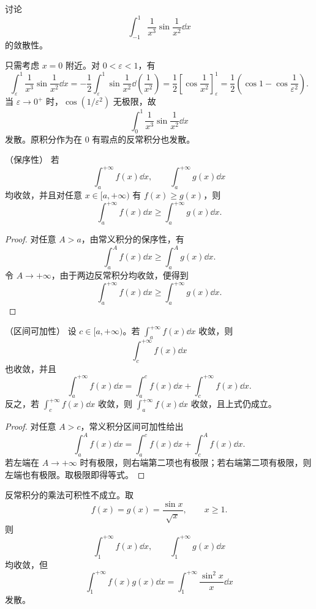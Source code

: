 \begin{example}
	讨论
	\[
	\int_{-1}^{1}\frac1{x^3}\sin\frac1{x^2}\dd x
	\]
	的敛散性。
\end{example}

\begin{solution}
	只需考虑 $x=0$ 附近。对 $0<\varepsilon<1$，有
	\[
	\int_{\varepsilon}^{1}\frac1{x^3}\sin\frac1{x^2}\dd x
	=-\frac12\int_{\varepsilon}^{1}\sin\frac1{x^2}\dd\left(\frac1{x^2}\right)
	=\frac12\left[\cos\frac1{x^2}\right]_{\varepsilon}^{1}
	=\frac12\left(\cos 1-\cos\frac1{\varepsilon^2}\right).
	\]
	当 $\varepsilon\to0^+$ 时，$\cos(1/\varepsilon^2)$ 无极限，故
	\[
	\int_0^1\frac1{x^3}\sin\frac1{x^2}\dd x
	\]
	发散。原积分作为在 $0$ 有瑕点的反常积分也发散。
\end{solution}

\begin{proposition}（保序性）
	若
	\[
	\int_a^{+\infty} f(x)\dd x,
	\qquad
	\int_a^{+\infty} g(x)\dd x
	\]
	均收敛，并且对任意 $x\in[a,+\infty)$ 有 $f(x)\geq g(x)$，则
	\[
	\int_a^{+\infty}f(x)\dd x\geq \int_a^{+\infty}g(x)\dd x.
	\]
\end{proposition}

\begin{proof}
	对任意 $A>a$，由常义积分的保序性，有
	\[
	\int_a^{A}f(x)\dd x\geq \int_a^{A}g(x)\dd x.
	\]
	令 $A\to+\infty$，由于两边反常积分均收敛，便得到
	\[
	\int_a^{+\infty}f(x)\dd x\geq \int_a^{+\infty}g(x)\dd x.
	\]
\end{proof}

\begin{proposition}（区间可加性）
	设 $c\in[a,+\infty)$。若 $\displaystyle\int_a^{+\infty}f(x)\dd x$ 收敛，则
	\[
	\int_c^{+\infty}f(x)\dd x
	\]
	也收敛，并且
	\[
	\int_a^{+\infty}f(x)\dd x
	=\int_a^c f(x)\dd x+\int_c^{+\infty}f(x)\dd x.
	\]
	反之，若 $\displaystyle\int_c^{+\infty}f(x)\dd x$ 收敛，则 $\displaystyle\int_a^{+\infty}f(x)\dd x$ 收敛，且上式仍成立。
\end{proposition}

\begin{proof}
	对任意 $A>c$，常义积分区间可加性给出
	\[
	\int_a^A f(x)\dd x=\int_a^c f(x)\dd x+\int_c^A f(x)\dd x.
	\]
	若左端在 $A\to+\infty$ 时有极限，则右端第二项也有极限；若右端第二项有极限，则左端也有极限。取极限即得等式。
\end{proof}

\begin{example}
	反常积分的乘法可积性不成立。取
	\[
	f(x)=g(x)=\frac{\sin x}{\sqrt{x}},\qquad x\geq1.
	\]
	则
	\[
	\int_1^{+\infty}f(x)\dd x,
	\qquad
	\int_1^{+\infty}g(x)\dd x
	\]
	均收敛，但
	\[
	\int_1^{+\infty}f(x)g(x)\dd x
	=\int_1^{+\infty}\frac{\sin^2x}{x}\dd x
	\]
	发散。
\end{example}


